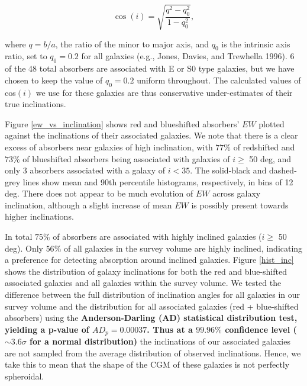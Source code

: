 \documentclass[twocolumn,tighten]{aastex6}
\begin{document}
\begin{equation}
	\cos(i) = \sqrt{\frac{q^2 - q_0^2}{1 - q_0^2}},
	\label{incEq}
\end{equation}

\noindent where $q = b/a$, the ratio of the minor to major axis, and $q_0$ is the intrinsic axis ratio, set to $q_0 = 0.2$ for all galaxies (e.g., Jones, Davies, and Trewhella 1996). 6 of the 48 total absorbers are associated with E or S0 type galaxies, but we have chosen to keep the value of $q_0 = 0.2$ uniform throughout. The calculated values of cos$(i)$ we use for these galaxies are thus conservative under-estimates of their true inclinations.

Figure \ref{ew_vs_inclination} shows red and blueshifted absorbers' $EW$ plotted against the inclinations of their associated galaxies. We note that there is a clear excess of absorbers near galaxies of high inclination, with $77\%$ of redshifted and $73\%$ of blueshifted absorbers being associated with galaxies of $i \geq$ 50 deg, and only 3 absorbers associated with a galaxy of $i<35$. The solid-black and dashed-grey lines show mean and 90th percentile histograms, respectively, in bins of 12 deg. There does not appear to be much evolution of $EW$ across galaxy inclination, although a slight increase of mean $EW$ is possibly present towards higher inclinations.

In total $75\%$ of absorbers are associated with highly inclined galaxies ($i \geq$ 50 deg). Only $56\%$ of all galaxies in the survey volume are highly inclined, indicating a preference for detecting absorption around inclined galaxies. Figure \ref{hist_inc} shows the distribution of galaxy inclinations for both the red and blue-shifted associated galaxies and all galaxies within the survey volume. We tested the difference between the full distribution of inclination angles for all galaxies in our survey volume and the distribution for all associated galaxies (red + blue-shifted absorbers) using the \textbf{Anderson-Darling (AD) statistical distribution test, yielding a p-value of $AD_{p} = 0.00037$. Thus at a $99.96\%$ confidence level ($\sim 3.6 \sigma$ for a normal distribution)} the inclinations of our associated galaxies are not sampled from the average distribution of observed inclinations. Hence, we take this to mean that the shape of the CGM of these galaxies is not perfectly spheroidal. 
\end{document}
